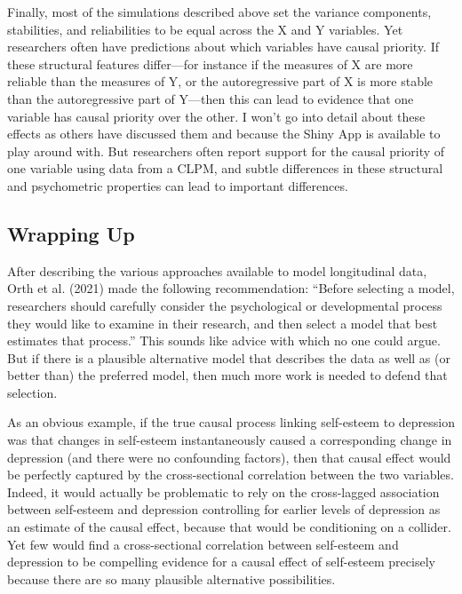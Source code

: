 \documentclass[
  english,
  man,floatsintext]{apa6}
\begin{document}
Finally, most of the simulations described above set the variance components, stabilities, and reliabilities to be equal across the X and Y variables. Yet researchers often have predictions about which variables have causal priority. If these structural features differ---for instance if the measures of X are more reliable than the measures of Y, or the autoregressive part of X is more stable than the autoregressive part of Y---then this can lead to evidence that one variable has causal priority over the other. I won't go into detail about these effects as others have discussed them and because the Shiny App is available to play around with. But researchers often report support for the causal priority of one variable using data from a CLPM, and subtle differences in these structural and psychometric properties can lead to important differences.

\hypertarget{wrapping-up}{%
\subsection{Wrapping Up}\label{wrapping-up}}

After describing the various approaches available to model longitudinal data, Orth et al. (2021) made the following recommendation: ``Before selecting a model, researchers should carefully consider the psychological or developmental process they would like to examine in their research, and then select a model that best estimates that process.'' This sounds like advice with which no one could argue. But if there is a plausible alternative model that describes the data as well as (or better than) the preferred model, then much more work is needed to defend that selection.

As an obvious example, if the true causal process linking self-esteem to depression was that changes in self-esteem instantaneously caused a corresponding change in depression (and there were no confounding factors), then that causal effect would be perfectly captured by the cross-sectional correlation between the two variables. Indeed, it would actually be problematic to rely on the cross-lagged association between self-esteem and depression controlling for earlier levels of depression as an estimate of the causal effect, because that would be conditioning on a collider. Yet few would find a cross-sectional correlation between self-esteem and depression to be compelling evidence for a causal effect of self-esteem precisely because there are so many plausible alternative possibilities.
\end{document}
